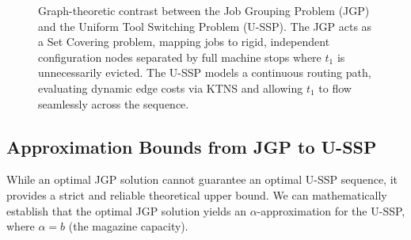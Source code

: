 \documentclass[12pt]{article}
\begin{document}
\begin{figure}[h!]
	\caption{Graph-theoretic contrast between the Job Grouping Problem (JGP) and the Uniform Tool Switching Problem (U-SSP). The JGP acts as a Set Covering problem, mapping jobs to rigid, independent configuration nodes separated by full machine stops where $t_1$ is unnecessarily evicted. The U-SSP models a continuous routing path, evaluating dynamic edge costs via KTNS and allowing $t_1$ to flow seamlessly across the sequence.}
	\label{fig:6job_ring}
\end{figure}


\subsection{Approximation Bounds from JGP to U-SSP}

While an optimal JGP solution cannot guarantee an optimal U-SSP sequence, it provides a strict and reliable theoretical upper bound. We can mathematically establish that the optimal JGP solution yields an $\alpha$-approximation for the U-SSP, where $\alpha = b$ (the magazine capacity).
\end{document}
